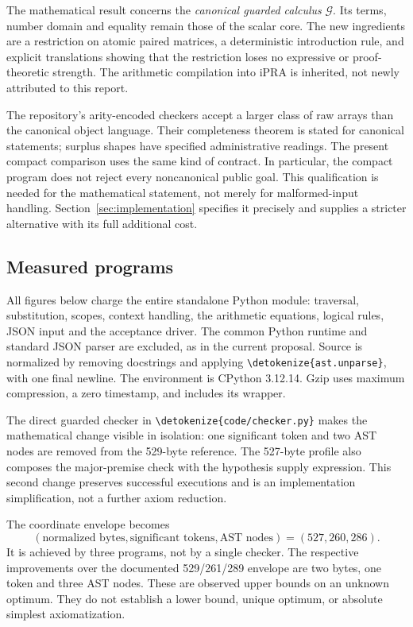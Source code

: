 \documentclass[11pt,letterpaper]{article}
\theoremstyle{definition}\newtheorem{definition}[theorem]{Definition}
\theoremstyle{remark}\newtheorem{remark}[theorem]{Remark}
\newcommand{\file}[1]{\expandafter\nolinkurl\expandafter{\detokenize{#1}}}
\begin{document}
The mathematical result concerns the \emph{canonical guarded calculus}
\(\mathcal G\). Its terms, number domain and equality remain those of
the scalar core. The new ingredients are a restriction on atomic
paired matrices, a deterministic introduction rule, and explicit
translations showing that the restriction loses no expressive or
proof-theoretic strength. The arithmetic compilation into iPRA is
inherited, not newly attributed to this report.

The repository's arity-encoded checkers accept a larger class of raw
arrays than the canonical object language. Their completeness theorem
is stated for canonical statements; surplus shapes have specified
administrative readings. The present compact comparison uses the same
kind of contract. In particular, the compact program does not reject
every noncanonical public goal. This qualification is needed for the
mathematical statement, not merely for malformed-input handling.
Section~\ref{sec:implementation} specifies it precisely and supplies a
stricter alternative with its full additional cost.

\subsection{Measured programs}
All figures below charge the entire standalone Python module: traversal,
substitution, scopes, context handling, the arithmetic equations, logical
rules, JSON input and the acceptance driver. The common Python runtime
and standard JSON parser are excluded, as in the current proposal.
Source is normalized by removing docstrings and applying
\file{ast.unparse}, with one final newline. The environment is CPython
3.12.14. Gzip uses maximum compression, a zero timestamp, and includes
its wrapper.



The direct guarded checker in \file{code/checker.py} makes the
mathematical change visible in isolation: one significant token and two
AST nodes are removed from the 529-byte reference. The 527-byte profile
also composes the major-premise check with the hypothesis supply
expression. This second change preserves successful executions and is
an implementation simplification, not a further axiom reduction.

The coordinate envelope becomes
\[
 (\text{normalized bytes},\text{significant tokens},\text{AST nodes})
       =(527,260,286).
\]
It is achieved by three programs, not by a single checker. The respective
improvements over the documented 529/261/289 envelope are two bytes,
one token and three AST nodes. These are observed upper bounds on an
unknown optimum. They do not establish a lower bound, unique optimum,
or absolute simplest axiomatization.
\end{document}
